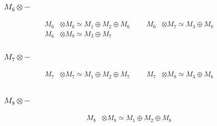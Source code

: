 \subsubsection{$ M_{6}\otimes -$}
\begin{align*}
M_{6} &\otimes M_{6} \simeq M_{1} \oplus M_{2} \oplus M_{6} &&& M_{6} &\otimes M_{7} \simeq M_{3} \oplus M_{8}\\
M_{6} &\otimes M_{8} \simeq M_{3} \oplus M_{7}
\end{align*}

\subsubsection{$ M_{7}\otimes -$}
\begin{align*}
M_{7} &\otimes M_{7} \simeq M_{1} \oplus M_{2} \oplus M_{7} &&& M_{7} &\otimes M_{8} \simeq M_{3} \oplus M_{6}\\
\end{align*}

\subsubsection{$ M_{8}\otimes -$}
\begin{align*}
M_{8} &\otimes M_{8} \simeq M_{1} \oplus M_{2} \oplus M_{8}
\end{align*}

